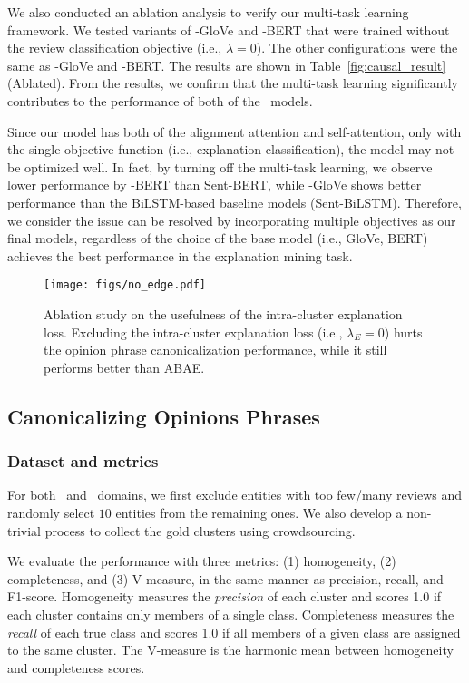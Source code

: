 We also conducted an ablation analysis to verify our multi-task learning framework. We tested variants of \expcls-GloVe and \expcls-BERT that were trained without the review classification objective (i.e., $\lambda=0$). The other configurations were the same as \expcls-GloVe and \expcls-BERT. The results are shown in Table~\ref{fig:causal_result} ({\sc Ablated}). From the results, we confirm that the multi-task learning significantly contributes to the performance of both of the \expcls\ models.

Since our model has both of the alignment attention and self-attention, only with the single objective function (i.e., explanation classification), the model may not be optimized well. In fact, by turning off the multi-task learning, we observe lower performance by \expcls-BERT than Sent-BERT, while \expcls-GloVe shows better performance than the BiLSTM-based baseline models (Sent-BiLSTM). 
Therefore, we consider the issue can be resolved by incorporating multiple objectives as our final models, regardless of the choice of the base model (i.e., GloVe, BERT) achieves the best performance in the explanation mining task.

\begin{figure}[t!]
    \centering
    \texttt{[image: figs/no\_edge.pdf]}
    \caption{Ablation study on the usefulness of the intra-cluster explanation loss. Excluding the intra-cluster explanation loss (i.e., $\lambda_E=0$) hurts the opinion phrase canonicalization performance, while it still performs better than ABAE.}
    \label{fig:merge:ablation}
    \vspace{-2mm}
\end{figure}

\subsection{Canonicalizing Opinions Phrases}
\newcommand{\glove}{{AvgWE}}
\subsubsection{Dataset and metrics} For both \hotel\ and \restaurant\ domains, we first exclude entities with too few/many reviews and randomly select $10$ entities from the remaining ones. 
We also develop a non-trivial process to collect the gold clusters using crowdsourcing.  

We evaluate the performance with three metrics: (1) homogeneity, (2) completeness, and (3) V-measure, in the same manner as precision, recall, and F1-score. Homogeneity measures the {\it precision} of each cluster and scores 1.0 if each cluster contains only members of a single class. Completeness measures the {\it recall} of each true class and scores 1.0 if all members of a given class are assigned to the same cluster.
The V-measure is the harmonic mean between homogeneity and completeness scores. 

